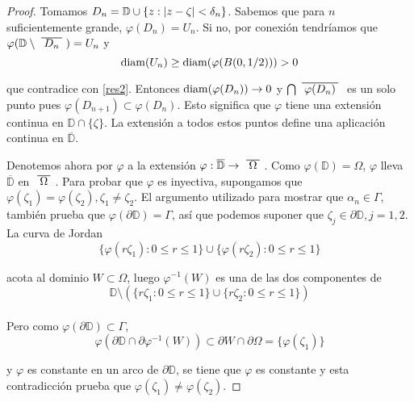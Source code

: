\begin{proof}
    Tomamos $D_n = \mathbb{D} \cup \{ z: \left\lvert z - \zeta\right\rvert < \delta_n \}$. Sabemos que para $n$ suficientemente grande, $\varphi(D_n) = U_n$. Si no, por conexión tendríamos que $\varphi(\mathbb{D} \setminus \xbar{D_n}) = U_n$ y
    \begin{equation*}
        \operatorname{diam} (U_n) \geq \operatorname{diam} (\varphi(B(0, 1/2))) > 0
    \end{equation*}

    que contradice con \ref{res2}. Entonces $\operatorname{diam}(\varphi(D_n)) \rightarrow 0$ y $\bigcap \xbar{\varphi(D_n)}$ es un solo punto pues $\varphi(D_{n+1}) \subset \varphi(D_n)$. Esto significa que $\varphi$ tiene una extensión continua en $\mathbb{D} \cap \{ \zeta \}$. La extensión a todos estos puntos define una aplicación continua en $\overline{\mathbb{D}}$.

    Denotemos ahora por $\varphi$ a la extensión $\varphi : \overline{\mathbb{D}} \rightarrow \xbar{\Omega}$. Como $\varphi(\mathbb{D}) = \Omega$, $\varphi$ lleva  $\overline{\mathbb{D}}$ en $\xbar{\Omega}$. Para probar que $\varphi$ es inyectiva, supongamos que $\varphi(\zeta_1) = \varphi(\zeta_2), \zeta_1 \not = \zeta_2$. El argumento utilizado para mostrar que $\alpha_n \in \Gamma$, también prueba que $\varphi (\partial \mathbb{D}) = \Gamma$, así que podemos suponer que $\zeta_j \in \partial \mathbb{D}, j=1,2$. La curva de Jordan
    \begin{equation*}
        \{\varphi (r \zeta_1) : 0 \leq r \leq 1\} \cup \{\varphi (r \zeta_2) : 0 \leq r \leq 1\}
    \end{equation*}

    acota al dominio $W \subset \Omega$, luego $\varphi ^{-1} (W)$ es una de las dos componentes de
    \begin{equation*}
        \mathbb{D} \setminus ( \{ r \zeta_1 : 0 \leq r \leq 1\} \cup \{ r \zeta_2 : 0 \leq r \leq 1\})
    \end{equation*}
    \\
    Pero como $\varphi(\partial \mathbb{D}) \subset \Gamma$,
    \begin{equation*}
        \varphi(\partial \mathbb{D} \cap \partial \varphi ^{-1} (W)) \subset \partial W \cap \partial \Omega = \{ \varphi (\zeta_1)\}
    \end{equation*}

    y $\varphi$ es constante en un arco de $\partial \mathbb{D}$, se tiene que $\varphi$ es constante y esta contradicción prueba que $\varphi(\zeta_1) \not = \varphi(\zeta_2)$.
\end{proof}

